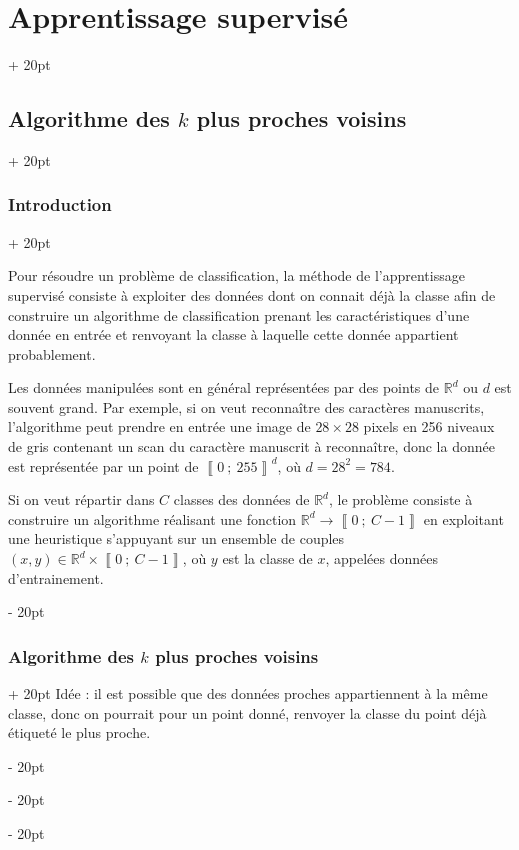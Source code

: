 \documentclass[a4paper, 12pt, twoside]{article}
\newcommand{\R}{\mathbb{R}} %
\newcommand{\nset}[2]{\left\llbracket #1\ ;\ #2 \right\rrbracket}
\newcommand{\ind}[1][20pt]{\advance\leftskip + #1}
\newcommand{\deind}[1][20pt]{\advance\leftskip - #1}
\newenvironment{indt}[2][20pt]{#2 \par \ind[#1]}{\par \deind} %
\begin{document}
    \begin{indt}{\section{Apprentissage supervisé}}
        \begin{indt}{\subsection{Algorithme des $k$ plus proches voisins}}
            \begin{indt}{\subsubsection{Introduction}}
                \label{2.1.1}

                Pour résoudre un problème de classification, la méthode de l'apprentissage supervisé consiste à exploiter des données dont on connait déjà la classe afin de construire un algorithme de classification prenant les caractéristiques d'une donnée en entrée et renvoyant la classe à laquelle cette donnée appartient probablement.

                Les données manipulées sont en général représentées par des points de $\R^d$ ou $d$ est souvent grand.
                Par exemple, si on veut reconnaître des caractères manuscrits, l'algorithme peut prendre en entrée une image de $28 \times 28$ pixels en 256 niveaux de gris contenant un scan du caractère manuscrit à reconnaître, donc la donnée est représentée par un point de $\nset{0}{255}^d$, où $d = 28^2 = 784$.

                Si on veut répartir dans $C$ classes des données de $\R^d$, le problème consiste à construire un algorithme réalisant une fonction $\R^d \longrightarrow \nset 0 {C - 1}$ en exploitant une heuristique s'appuyant sur un ensemble de couples $(x, y) \in \R^d \times \nset 0 {C - 1}$, où $y$ est la classe de $x$, appelées données d'entrainement.
            \end{indt}

            \vspace{12pt}
            
            \begin{indt}{\subsubsection{Algorithme des $k$ plus proches voisins}}
                Idée : il est possible que des données proches appartiennent à la même classe, donc on pourrait pour un point donné, renvoyer la classe du point déjà étiqueté le plus proche.


\end{indt}
\end{indt}
\end{indt}
\end{document}
